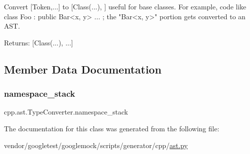 \begin{DoxyVerb}Convert [Token,...] to [Class(...), ] useful for base classes.
For example, code like class Foo : public Bar<x, y> { ... };
the "Bar<x, y>" portion gets converted to an AST.

Returns:
  [Class(...), ...]
\end{DoxyVerb}
 

\subsection{Member Data Documentation}
\mbox{\label{classcpp_1_1ast_1_1_type_converter_abb739f15c6cd0800e07c086c2b30833e}} 
\subsubsection{\texorpdfstring{namespace\+\_\+stack}{namespace\_stack}}
{\footnotesize\ttfamily cpp.\+ast.\+Type\+Converter.\+namespace\+\_\+stack}



The documentation for this class was generated from the following file\+:\begin{DoxyCompactItemize}
\item 
vendor/googletest/googlemock/scripts/generator/cpp/\hyperlink{ast_8py}{ast.\+py}\end{DoxyCompactItemize}
